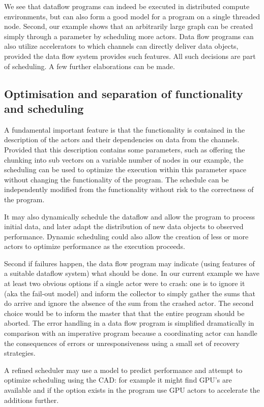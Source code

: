 \documentclass[11pt,a4paper]{article}
\begin{document}
We see that dataflow programs can indeed be executed in distributed
compute environments, but can also form a good model for a program on
a single threaded node.  Second, our example shows that an arbitrarily
large graph can be created simply through a parameter by scheduling
more actors.  Data flow programs can also utilize accelerators to
which channels can directly deliver data objects, provided the data
flow system provides such features.  All such decisions are part of
scheduling.  A few further elaborations can be made.

\subsection{Optimisation and separation of functionality and scheduling}

A fundamental important feature is that the functionality is contained
in the description of the actors and their dependencies on data from
the channels.  Provided that this description contains some
parameters, such as offering the chunking into sub vectors on a
variable number of nodes in our example, the scheduling can be used to
optimize the execution within this parameter space without changing
the functionality of the program.  The schedule can be independently
modified from the functionality without risk to the correctness of the
program.

It may also dynamically schedule the dataflow and allow the program to
process initial data, and later adapt the distribution of new data
objects to observed performance.  Dynamic scheduling could also allow
the creation of less or more actors to optimize performance as the
execution proceeds.

Second if failures happen, the data flow program may indicate (using
features of a suitable dataflow system) what should be done.  In our
current example we have at least two obvious options if a single actor
were to crash: one is to ignore it (aka the fail-out model) and inform
the collector to simply gather the sums that do arrive and ignore the
absence of the sum from the crashed actor.  The second choice would be
to inform the master that that the entire program should be
aborted. The error handling in a data flow program is simplified
dramatically in comparison with an imperative program because a
coordinating actor can handle the consequences of errors or
unresponsiveness using a small set of recovery strategies.

A refined scheduler may use a model to predict performance and attempt
to optimize scheduling using the CAD: for example it might find GPU’s
are available and if the option exists in the program use GPU actors
to accelerate the additions further.
\end{document}
